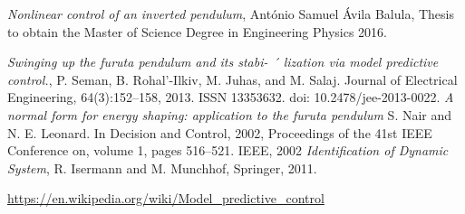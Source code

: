 \documentclass[a4paper,11pt]{article}
\theoremstyle{definition} \newtheorem{deff}{Definicija}[section]
\theoremstyle{definition} \newtheorem{prim}[deff]{Primer}
\theoremstyle{plain} \newtheorem{teor}[deff]{Teorema}
\begin{document}
	\begin{thebibliography}{9}
		\emph{Nonlinear control of an inverted pendulum}, António Samuel Ávila Balula, Thesis to obtain the Master of Science Degree in
		Engineering Physics 2016.
		
		\emph{Swinging up the furuta pendulum and its stabi- ´
			lization via model predictive control.}, P. Seman, B. Rohal’-Ilkiv, M. Juhas, and M. Salaj.  Journal of Electrical Engineering, 64(3):152–158, 2013. ISSN
		13353632. doi: 10.2478/jee-2013-0022.
		\emph{A normal form for energy shaping: application to the furuta pendulum}
		S. Nair and N. E. Leonard. 
		In Decision and Control, 2002, Proceedings of the 41st IEEE Conference on, volume 1, pages
		516–521. IEEE, 2002
		\emph{Identification of Dynamic System}, R. Isermann and M. Munchhof, Springer, 2011.
		
		\url{https://en.wikipedia.org/wiki/Model_predictive_control}
		
	\end{thebibliography}
\end{document}
